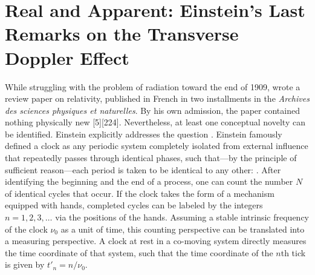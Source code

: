 \documentclass[pdflatex]{sn-jnl}
\newcommand{\TDE}{Transverse Doppler Effect\xspace}
\begin{document}
\section{Real and Apparent: Einstein’s Last Remarks on the \TDE}
%
While struggling with the problem of radiation toward the end of 1909, \citet{Einstein1910} wrote a review paper on relativity, published in French in two installments in the \textit{Archives des sciences physiques et naturelles}. By his own admission, the paper contained nothing physically new [5][224]. Nevertheless, at least one conceptual novelty can be identified. Einstein explicitly addresses the question  \citep[21]{Einstein1910}. Einstein famously defined a clock as any periodic system completely isolated from external influence that repeatedly passes through identical phases, such that---by the principle of sufficient reason---each period is taken to be identical to any other:  \citep[21]{Einstein1910}. After identifying the beginning and the end of a process, one can count the number $N$ of identical cycles that occur. If the clock takes the form of a mechanism equipped with hands, completed cycles can be labeled by the integers $n=1,2,3,\ldots$ via the positions of the hands. Assuming a stable intrinsic frequency of the clock $\nu_0$ as a unit of time, this counting perspective can be translated into a measuring perspective. A clock at rest in a co-moving system directly measures the time coordinate of that system, such that the time coordinate of the $n$th tick is given by $t'_n = n/\nu_0$.
\end{document}
